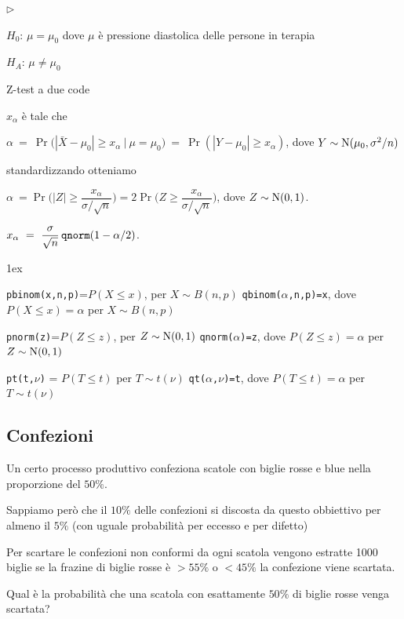 \documentclass[11pt,openany]{book}
\newcommand{\mylabel}[1]{{\footnotesize\textsf{#1}}\hfill}
\renewenvironment{itemize}
  {\begin{list}{$\triangleright$}{%
   \setlength{\parskip}{0mm}
   \setlength{\topsep}{.2\baselineskip}
   \setlength{\rightmargin}{0mm}
   \setlength{\listparindent}{0mm}
   \setlength{\itemindent}{0mm}
   \setlength{\labelwidth}{3ex}
   \setlength{\itemsep}{.4\baselineskip}
   \setlength{\parsep}{0mm}
   \setlength{\partopsep}{0mm}
   \setlength{\labelsep}{1ex}
   \setlength{\leftmargin}{\labelwidth+\labelsep}
   \let\makelabel\mylabel}}{%
   \end{list}\vspace*{-1.3mm}}
\begin{document}
\begin{itemize}
\item[1.] $H_0$: $\mu=\mu_0$ dove $\mu$ è pressione diastolica delle persone in terapia 
\item[2.] $H_A$: $\mu\neq\mu_0$
\item[3.] Z-test a due code
\item[4.] $x_\alpha$ è tale che \medskip

$\alpha\ =\ \Pr\big(|\bar X-\mu_0|\ge x_\alpha\ \mathbin\big|\ \mu=\mu_0\big)\ =\ \Pr(|Y-\mu_0|\ge x_\alpha)$, dove $Y\sim {\rm N}(\mu_0,\sigma^2/n)$ \medskip

standardizzando otteniamo \medskip

$\alpha\ =\Pr\bigg(|Z|\ge \dfrac{x_\alpha}{\sigma/\sqrt n}\bigg)=2\Pr\bigg(Z\ge \dfrac{x_\alpha}{\sigma/\sqrt n}\bigg)$, dove $Z\sim {\rm N}(0,1)$.

\hfill $x_\alpha\ =\ \dfrac{\sigma}{\sqrt n}\,{\tt qnorm}(1-\alpha/2)$.


\end{itemize}

\vfill
\parskip1ex
{\hrulefill\scriptsize

{\tt pbinom(x,n,p)}=$P(X\le x)$, per $X\sim B(n,p)$
\hfill 
{\tt qbinom($\alpha$,n,p)=x},  dove $P(X\le x)=\alpha$ per $X\sim B(n,p)$

{\tt pnorm(z)}=$P(Z\le z)$, per $Z\sim {\rm N}(0,1)$
\hfill 
{\tt qnorm($\alpha$)=z},  dove $P(Z\le z)=\alpha$ per $Z\sim {\rm N}(0,1)$

{\tt pt(t,$\nu$)} = $P(T\le t)$ per $T\sim t(\nu)$
\hfill
{\tt qt($\alpha$,$\nu$)=t}, dove $P(T\le t)=\alpha$ per $T\sim t(\nu)$

}


\clearpage\subsection{Confezioni}

Un certo processo produttivo confeziona scatole con biglie rosse e blue nella proporzione del $50\%$.

Sappiamo però che il $10\%$ delle confezioni si discosta da questo obbiettivo per almeno il $5\%$
 (con uguale probabilità per eccesso e per difetto)

Per scartare le confezioni non conformi da ogni scatola vengono estratte 1000 biglie se la frazine di biglie rosse è $>55\%$ o $<45\%$ la confezione viene scartata.

Qual è la probabilità che una scatola con esattamente $50\%$ di biglie rosse venga scartata?
\end{document}
